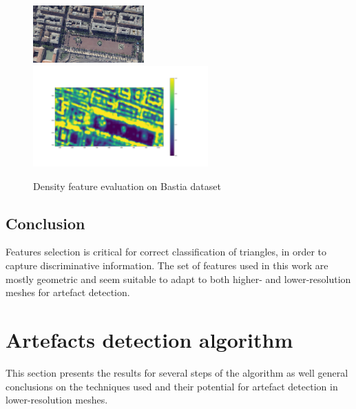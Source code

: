 \documentclass{kththesis}
\begin{document}
\begin{figure}[H]
    \centering
    \includegraphics[width=0.38\textwidth]{images/features/bastia_view.png} ~\includegraphics[width=0.60\textwidth]{images/features/bastia_density_tree.png}
    \caption{Density feature evaluation on Bastia dataset}
    \label{fig:bastia_density}
\end{figure}

\subsection{Conclusion}
Features selection is critical for correct classification of triangles, in order to capture discriminative information. The set of features used in this work are mostly geometric and seem suitable to adapt to both higher- and lower-resolution meshes for artefact detection. 
\section{Artefacts detection algorithm}
This section presents the results for several steps of the algorithm as well general conclusions on the techniques used and their potential for artefact detection in lower-resolution meshes. 
\end{document}
